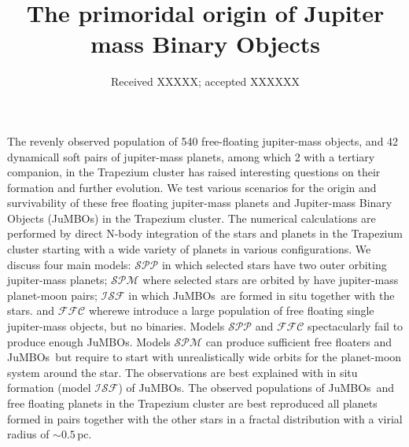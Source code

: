 \documentclass[aa]{lib/aa}
\newcommand{\jumbos}{\mbox{JuMBOs}}
\begin{document}
 

   \title{The primoridal origin of Jupiter mass Binary Objects}
   \date{Received XXXXX; accepted XXXXXX}

  \abstract
      {The revenly observed population of 540
  free-floating jupiter-mass objects, and 42 dynamicall soft pairs of
  jupiter-mass planets, among which 2 with a tertiary companion, in the Trapezium cluster has
  raised interesting questions on their formation and further
  evolution. }
   {We test various scenarios for the origin and survivability of
  these free floating jupiter-mass planets and Jupiter-mass Binary Objects
  (JuMBOs) in the Trapezium cluster.  }
   {The numerical calculations are performed by direct N-body
     integration of the stars and planets in the Trapezium cluster
     starting with a wide variety of planets in various
     configurations. We discuss four main models: $\mathcal{SPP}$ in
     which selected stars have two outer orbiting jupiter-mass
     planets; $\mathcal{SPM}$ where selected stars are orbited by have
     jupiter-mass planet-moon pairs; $\mathcal{ISF}$ in which
     \jumbos\, are formed in situ together with the stars. and
     $\mathcal{FFC}$ wherewe introduce a large population of free
     floating single jupiter-mass objects, but no binaries.  }
   {Models $\mathcal{SPP}$ and $\mathcal{FFC}$ spectacularly fail to
     produce enough \jumbos. Models $\mathcal{SPM}$ can produce
     sufficient free floaters and \jumbos\, but require to start with
     unrealistically wide orbits for the planet-moon system around the
     star.  The observations are best explained with in situ formation
     (model $\mathcal{ISF}$) of \jumbos.  }
   {The observed populations of \jumbos\, and free floating planets in
     the Trapezium cluster are best reproduced all planets formed in
     pairs together with the other stars in a fractal distribution
     with a virial radius of $\sim 0.5$\,pc.  }
   
\end{document}

